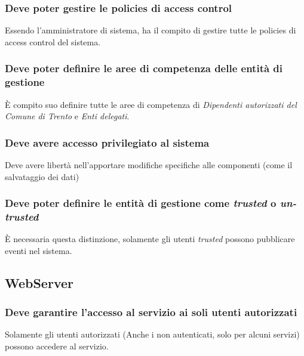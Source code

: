\documentclass{article}
\begin{document}
\subsubsection{Deve poter gestire le policies di access control}
\label{5.5.1}
Essendo l'amministratore di sistema, ha il compito di gestire tutte le policies di access control del sistema.

\subsubsection{Deve poter definire le aree di competenza delle entità di gestione}
\label{5.5.2}
È compito suo definire tutte le aree di competenza di \textit{Dipendenti autorizzati del Comune di Trento} e \textit{Enti delegati}.

\subsubsection{Deve avere accesso privilegiato al sistema}
\label{5.5.3}
Deve avere libertà nell'apportare modifiche specifiche alle componenti (come il salvataggio dei dati)

\subsubsection{Deve poter definire le entità di gestione come \textit{trusted} o \textit{un-trusted}}
\label{5.5.4}
È necessaria questa distinzione, solamente gli utenti \textit{trusted} possono pubblicare eventi nel sistema.

\subsection{WebServer}

\subsubsection{Deve garantire l'accesso al servizio ai soli utenti autorizzati}
\label{5.6.1}
Solamente gli utenti autorizzati (Anche i non autenticati, solo per alcuni servizi) possono accedere al servizio.
\end{document}
